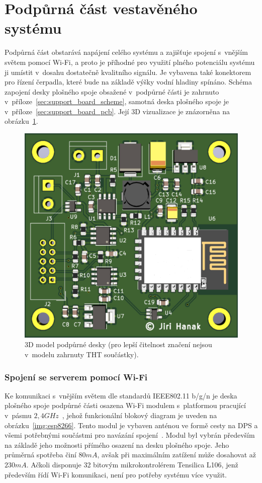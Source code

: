     \section{Podpůrná část vestavěného systému}
        Podpůrná část obstarává napájení celého systému a zajišťuje spojení s~vnějším světem pomocí Wi-Fi, a proto je příhodné pro využití plného potenciálu systému ji umístit v~dosahu dostatečně kvalitního signálu. Je vybavena také konektorem pro řízení čerpadla, které bude na základě výšky vodní hladiny spínáno. Schéma zapojení desky plošného spoje obsažené v~podpůrné části je zahrnuto v~příloze~\ref{sec:support_board_scheme}, samotná deska plošného spoje je v~příloze~\ref{sec:support_board_pcb}. Její 3D vizualizace je znázorněna na obrázku~\ref{img:support_board_3D}.

        \begin{figure}[h]
            \centering
            \includegraphics[width=0.6\linewidth]{obrazky-figures/support_board_3D.pdf}
            \caption{3D model podpůrné desky (pro lepší čitelnost značení nejsou v~modelu zahrnuty THT součástky).}
            \label{img:support_board_3D}
        \end{figure}

        \subsubsection{Spojení se serverem pomocí Wi-Fi}
            Ke komunikaci s~vnějším světem dle standardů IEEE802.11 b/g/n je deska plošného spoje podpůrné části osazena Wi-Fi modulem  s~platformou  pracující v~pásmu $2,4\unit{GHz}$~\cite{io:esp8266}, jehož funkcionální blokový diagram je uveden na obrázku~\ref{img:esp8266}. Tento modul je vybaven anténou ve formě cesty na DPS a všemi potřebnými součástmi pro navázání spojení~\cite{io:esp12}. Modul byl vybrán především na základě jeho možnosti přímého osazení na desku plošného spoje. Jeho průměrná spotřeba činí $80\unit{mA}$, avšak při maximálním zatížení může dosahovat až $230\unit{mA}$. Ačkoli disponuje 32 bitovým mikrokontrolérem Tensilica L106, jenž především řídí Wi-Fi komunikaci, není pro potřeby systému více využit. 

